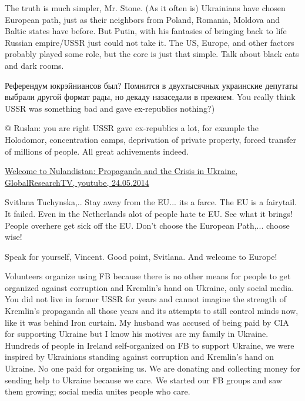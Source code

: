 \begin{itemize}

The truth is much simpler, Mr. Stone. (As it often is) Ukrainians have chosen
European path, just as their neighbors from Poland, Romania, Moldova and Baltic
states have before. But Putin, with his fantasies of bringing back to life
Russian empire/USSR just could not take it. The US, Europe, and other factors
probably played some role, but the core is just that simple. Talk about black
cats and dark rooms.

\begin{itemize} %

Референдум юкрэйниансов был? Помнится в двухтысячных украинские депутаты
выбрали другой формат рады, но декаду назаседали в прежнем. You really think
USSR was something bad and gave ex-republics nothing?)


@ Ruslan: you are right USSR gave ex-republics a lot, for example the
Holodomor, concentration camps, deprivation of private property, forced
transfer of millions of people. All great achivements indeed.


\href{https://www.youtube.com/watch?v=yu8KTiLsLJw}{%
Welcome to Nulandistan: Propaganda and the Crisis in Ukraine, GlobalResearchTV, youtube, 24.05.2014
}


Svitlana Tuchynska,.. Stay away from the EU... its a farce. The EU is a
fairytail. It failed. Even in the Netherlands alot of people hate te EU. See
what it brings! People overhere get sick off the EU. Don't choose the European
Path,... choose wise!


Speak for yourself, Vincent. Good point, Svitlana. And welcome to Europe!

\end{itemize} %


Volunteers organize using FB because there is no other means for people to get
organized against corruption and Kremlin's hand on Ukraine, only social media.
You did not live in former USSR for years and cannot imagine the strength of
Kremlin's propaganda all those years and its attempts to still control minds
now, like it was behind Iron curtain. My husband was accused of being paid by
CIA for supporting Ukraine but I know his motives are my family in Ukraine.
Hundreds of people in Ireland self-organized on FB to support Ukraine, we were
inspired by Ukrainians standing against corruption and Kremlin's hand on
Ukraine. No one paid for organising us. We are donating and collecting money
for sending help to Ukraine because we care. We started our FB groups and saw
them growing; social media unites people who care.


\end{itemize}

